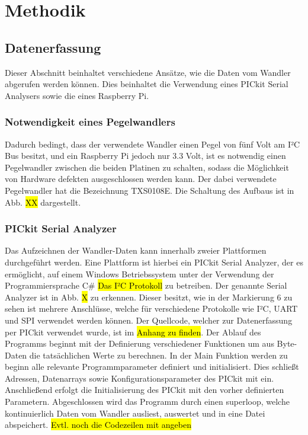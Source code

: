 \section{Methodik}

\subsection{Datenerfassung}
Dieser Abschnitt beinhaltet verschiedene Ansätze, wie die Daten vom Wandler abgerufen werden können. Dies beinhaltet die Verwendung eines PICkit Serial Analysers sowie die eines Raspberry Pi.


\subsubsection{Notwendigkeit eines Pegelwandlers}
Dadurch bedingt, dass der verwendete Wandler einen Pegel von fünf Volt am I²C Bus besitzt, und ein Raspberry Pi jedoch nur 3.3 Volt, ist es notwendig einen Pegelwandler zwischen die beiden Platinen zu schalten, sodass die Möglichkeit von Hardware defekten ausgeschlossen werden kann. Der dabei verwendete Pegelwandler hat die Bezeichnung TXS0108E. Die Schaltung des Aufbaus ist in Abb. \hl{XX} dargestellt. 

\subsubsection{PICkit Serial Analyzer}
Das Aufzeichnen der Wandler-Daten kann innerhalb zweier Plattformen durchgeführt werden. Eine Plattform ist hierbei ein PICkit Serial Analyzer, der es ermöglicht, auf einem Windows Betriebssystem unter der Verwendung der Programmiersprache C# \hl{Das I²C Protokoll} zu betreiben. Der genannte Serial Analyzer ist in Abb. \hl{X} zu erkennen. Dieser besitzt, wie in der Markierung 6 zu sehen ist mehrere Anschlüsse, welche für verschiedene Protokolle wie I²C, UART und SPI verwendet werden können. Der Quellcode, welcher zur Datenerfassung per PICkit verwendet wurde, ist im \hl{Anhang zu finden}. Der Ablauf des Programms beginnt mit der Definierung verschiedener Funktionen um aus Byte-Daten die tatsächlichen Werte zu berechnen. In der Main Funktion werden zu beginn alle relevante Programmparameter definiert und initialisiert. Dies schließt Adressen, Datenarrays sowie Konfigurationsparameter des PICkit mit ein.  Anschließend erfolgt die Initialisierung des PICkit mit den vorher definierten Parametern. Abgeschlossen wird das Programm durch einen superloop, welche kontinuierlich Daten vom Wandler ausliest, auswertet und in eine Datei abspeichert. \hl{Evtl. noch die Codezeilen mit angeben}

